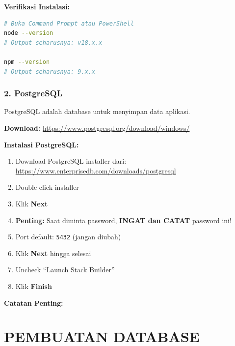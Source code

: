 \documentclass[12pt,a4paper]{article}
\begin{document}
\textbf{Verifikasi Instalasi:}
\begin{lstlisting}[language=bash]
# Buka Command Prompt atau PowerShell
node --version
# Output seharusnya: v18.x.x

npm --version
# Output seharusnya: 9.x.x
\end{lstlisting}

\subsubsection{2. PostgreSQL}
PostgreSQL adalah database untuk menyimpan data aplikasi.

\textbf{Download:} \url{https://www.postgresql.org/download/windows/}

\textbf{Instalasi PostgreSQL:}
\begin{enumerate}
    \item Download PostgreSQL installer dari:
    \url{https://www.enterprisedb.com/downloads/postgresql}
    \item Double-click installer
    \item Klik \textbf{Next}
    \item \textbf{Penting:} Saat diminta password, \textbf{INGAT dan CATAT} password ini!
    \item Port default: \texttt{5432} (jangan diubah)
    \item Klik \textbf{Next} hingga selesai
    \item Uncheck ``Launch Stack Builder''
    \item Klik \textbf{Finish}
\end{enumerate}

\textbf{Catatan Penting:}
\begin{center}
\end{center}

\newpage
\section{PEMBUATAN DATABASE}
\end{document}
